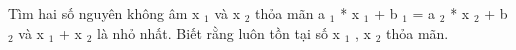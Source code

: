 Tìm hai số nguyên không âm x $_ 1 $ và x $_ 2 $ thỏa mãn a $_ 1 $ * x $_ 1 $ + b $_ 1 $ = a $_ 2 $ * x $_ 2 $ + b $_ 2 $ và x $_ 1 $ + x $_ 2 $ là nhỏ nhất. Biết rằng luôn tồn tại số x $_ 1 $ , x $_ 2 $ thỏa mãn.

\